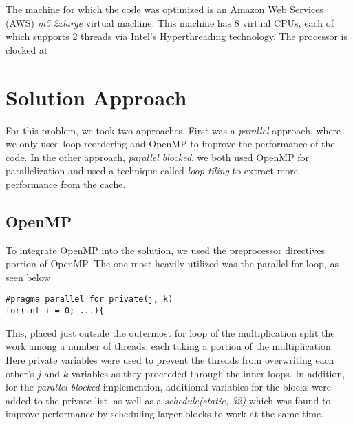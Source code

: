 \documentclass[letterpaper,twocolumn,10pt]{article}
\begin{document}
The machine for which the code was optimized is an Amazon Web Services (AWS)
\textit{m5.2xlarge} virtual machine. This machine has 8 virtual CPUs, each of
which supports 2 threads via Intel's Hyperthreading technology. The processor is
clocked at %

\section{Solution Approach}
For this problem, we took two approaches. First was a \textit{parallel} approach, where
we only used loop reordering and OpenMP to improve the performance of the code.
In the other approach, \textit{parallel blocked}, we both used OpenMP for parallelization
and used a technique called \textit{loop tiling} to extract more performance from
the cache.
\subsection{OpenMP}
To integrate OpenMP into the solution, we used the preprocessor directives portion
of OpenMP. The one most heavily utilized was the parallel for loop, as seen below
\begin{verbatim}
#pragma parallel for private(j, k)
for(int i = 0; ...){
\end{verbatim}
This, placed just outside the outermost for loop of the multiplication split the
work among a number of threads, each taking a portion of the multiplication.
Here private variables were used to prevent the threads from overwriting each
other's $j$ and $k$ variables as they proceeded through the inner loops. In addition,
for the \textit{parallel blocked} implemention, additional variables for the blocks
were added to the private list, as well as a \textit{schedule(static, 32)} which was
found to improve performance by scheduling larger blocks to work at the same time.
\end{document}
